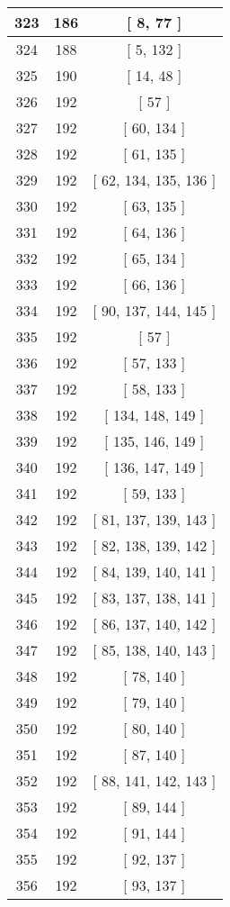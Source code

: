 \begin{center}
\begin{longtable}[H]{|| c c c ||}
\hline
323 & 186 & [ 8, 77 ] \\ 
\hline
324 & 188 & [ 5, 132 ] \\ 
\hline
325 & 190 & [ 14, 48 ] \\ 
\hline
326 & 192 & [ 57 ] \\ 
\hline
327 & 192 & [ 60, 134 ] \\ 
\hline
328 & 192 & [ 61, 135 ] \\ 
\hline
329 & 192 & [ 62, 134, 135, 136 ] \\ 
\hline
330 & 192 & [ 63, 135 ] \\ 
\hline
331 & 192 & [ 64, 136 ] \\ 
\hline
332 & 192 & [ 65, 134 ] \\ 
\hline
333 & 192 & [ 66, 136 ] \\ 
\hline
334 & 192 & [ 90, 137, 144, 145 ] \\ 
\hline
335 & 192 & [ 57 ] \\ 
\hline
336 & 192 & [ 57, 133 ] \\ 
\hline
337 & 192 & [ 58, 133 ] \\ 
\hline
338 & 192 & [ 134, 148, 149 ] \\ 
\hline
339 & 192 & [ 135, 146, 149 ] \\ 
\hline
340 & 192 & [ 136, 147, 149 ] \\ 
\hline
341 & 192 & [ 59, 133 ] \\ 
\hline
342 & 192 & [ 81, 137, 139, 143 ] \\ 
\hline
343 & 192 & [ 82, 138, 139, 142 ] \\ 
\hline
344 & 192 & [ 84, 139, 140, 141 ] \\ 
\hline
345 & 192 & [ 83, 137, 138, 141 ] \\ 
\hline
346 & 192 & [ 86, 137, 140, 142 ] \\ 
\hline
347 & 192 & [ 85, 138, 140, 143 ] \\ 
\hline
348 & 192 & [ 78, 140 ] \\ 
\hline
349 & 192 & [ 79, 140 ] \\ 
\hline
350 & 192 & [ 80, 140 ] \\ 
\hline
351 & 192 & [ 87, 140 ] \\ 
\hline
352 & 192 & [ 88, 141, 142, 143 ] \\ 
\hline
353 & 192 & [ 89, 144 ] \\ 
\hline
354 & 192 & [ 91, 144 ] \\ 
\hline
355 & 192 & [ 92, 137 ] \\ 
\hline
356 & 192 & [ 93, 137 ] \\ 

\end{longtable}
\end{center}
